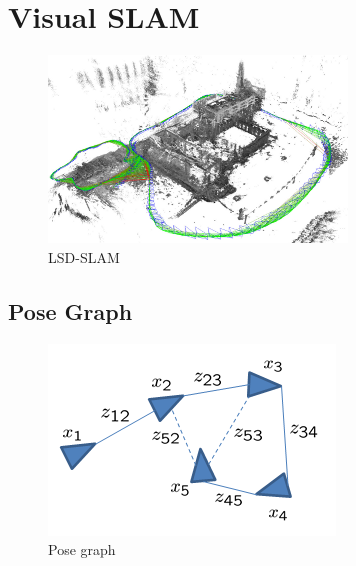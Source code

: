 \section{Visual SLAM}%
\label{sec:v-slam}

\begin{figure}[ht]
	\centering
	\includegraphics[width=\linewidth]{assets/img/lsd-slam.png}
	\caption{LSD-SLAM}%
	\label{fig:lsd-slam}
\end{figure}

\subsection{Pose Graph}%
\label{sub:pose-graph}

\begin{figure}[ht]
	\centering
	\includegraphics[width=\linewidth]{assets/img/pose-graph.png}
	\caption{Pose graph}%
	\label{fig:pose-graph}
\end{figure}

